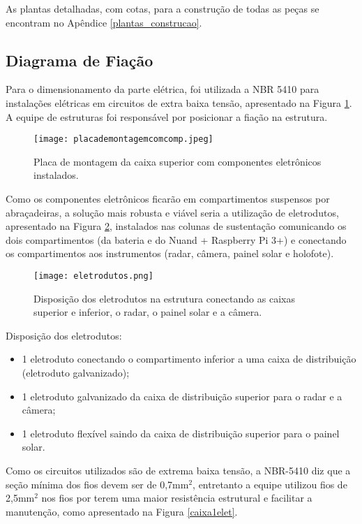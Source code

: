 As plantas detalhadas, com cotas, para a construção de todas as peças se encontram no Apêndice \ref{plantas_construcao}. 

\subsection{Diagrama de Fiação}

Para o dimensionamento da parte elétrica, foi utilizada a NBR 5410 \cite{protecao} para instalações elétricas em circuitos de extra baixa tensão, apresentado na Figura \ref{circ}. A equipe de estruturas foi responsável por posicionar a fiação na estrutura. 

\begin{figure}[h]
	\centering
    \texttt{[image: placademontagemcomcomp.jpeg]}
    \caption{Placa de montagem da caixa superior com componentes eletrônicos instalados.}
    \label{circ}
\end{figure}


Como os componentes eletrônicos ficarão em compartimentos suspensos por abraçadeiras, a solução mais robusta e viável seria a utilização de eletrodutos, apresentado na Figura \ref{eletrod}, instalados nas colunas de sustentação comunicando os dois compartimentos (da bateria e do Nuand + Raspberry Pi 3+) e conectando os compartimentos aos instrumentos (radar, câmera, painel solar e holofote).

\begin{figure}[h]
	\centering
    \texttt{[image: eletrodutos.png]}
    \caption{Disposição dos eletrodutos na estrutura conectando as caixas superior e inferior, o radar, o painel solar e a câmera.}
    \label{eletrod}
\end{figure}

Disposição dos eletrodutos:

\begin{itemize}
\item 1 eletroduto conectando o compartimento inferior a uma caixa de distribuição (eletroduto galvanizado);
\item 1 eletroduto galvanizado da caixa de distribuição superior para o radar e a câmera;
\item 1 eletroduto flexível saindo da caixa de distribuição superior para o painel solar.
\end{itemize}

Como os circuitos utilizados são de extrema baixa tensão, a NBR-5410 \cite{protecao} diz que a seção mínima dos fios devem ser de 0,7mm$^2$, entretanto a equipe utilizou fios de 2,5mm$^2$ nos fios por terem uma maior resistência estrutural e facilitar a manutenção, como apresentado na Figura \ref{caixa1elet}.

